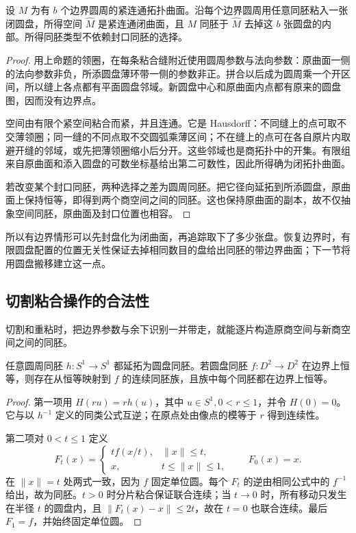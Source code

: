 \begin{proposition}\label{g1:prop:cap-boundary}
	设 \(M\) 为有 \(b\) 个边界圆周的紧连通拓扑曲面。沿每个边界圆周用任意同胚粘入一张闭圆盘，所得空间 \(\widehat M\) 是紧连通闭曲面，且 \(M\) 同胚于 \(\widehat M\) 去掉这 \(b\) 张圆盘的内部。所得同胚类型不依赖封口同胚的选择。
\end{proposition}
\begin{proof}
	用上命题的领圈，在每条粘合缝附近使用圆周参数与法向参数：原曲面一侧的法向参数非负，所添圆盘薄环带一侧的参数非正。拼合以后成为圆周乘一个开区间，所以缝上各点都有平面圆盘邻域。新圆盘中心和原曲面内点都有原来的圆盘图，因而没有边界点。

	空间由有限个紧空间粘合而紧，并且连通。它是 Hausdorff：不同缝上的点可取不交薄领圈；同一缝的不同点取不交圆弧乘薄区间；不在缝上的点可在各自原片内取避开缝的邻域，或先把薄领圈缩小后分开。这些邻域也是商拓扑中的开集。有限组来自原曲面和添入圆盘的可数坐标基给出第二可数性，因此所得确为闭拓扑曲面。

	若改变某个封口同胚，两种选择之差为圆周同胚。把它径向延拓到所添圆盘，原曲面上保持恒等，即得到两个商空间之间的同胚。这也保持原曲面的副本，故不仅抽象空间同胚，原曲面及封口位置也相容。
\end{proof}

所以有边界情形可以先封盘化为闭曲面，再追踪取下了多少张盘。恢复边界时，有限圆盘配置的位置无关性保证去掉相同数目的盘给出同胚的带边界曲面；下一节将用圆盘搬移建立这一点。

\subsection{切割粘合操作的合法性}
\label{g1:subsec:0603:03}

切割和重粘时，把边界参数与余下识别一并带走，就能逐片构造原商空间与新商空间之间的同胚。

\begin{lemma}\label{g1:lem:disk-extension}
	任意圆周同胚 \(h:S^1\to S^1\) 都延拓为圆盘同胚。若圆盘同胚 \(f:D^2\to D^2\) 在边界上恒等，则存在从恒等映射到 \(f\) 的连续同胚族，且族中每个同胚都在边界上恒等。
\end{lemma}
\begin{proof}
	第一项用 \(H(ru)=r h(u)\)，其中 \(u\in S^1,0<r\le1\)，并令 \(H(0)=0\)。它与以 \(h^{-1}\) 定义的同类公式互逆；在原点处由像点的模等于 \(r\) 得到连续性。

	第二项对 \(0<t\le1\) 定义
	\[
		F_t(x)=
		\begin{cases}
			t f(x/t),&\lVert x\rVert\le t,\\
			x,&t\le\lVert x\rVert\le1,
		\end{cases}
		\qquad F_0(x)=x.
	\]
	在 \(\lVert x\rVert=t\) 处两式一致，因为 \(f\) 固定单位圆。每个 \(F_t\) 的逆由相同公式中的 \(f^{-1}\) 给出，故为同胚。\(t>0\) 时分片粘合保证联合连续；当 \(t\to0\) 时，所有移动只发生在半径 \(t\) 的圆盘内，且 \(\lVert F_t(x)-x\rVert\le2t\)，故在 \(t=0\) 也联合连续。最后 \(F_1=f\)，并始终固定单位圆。
\end{proof}


